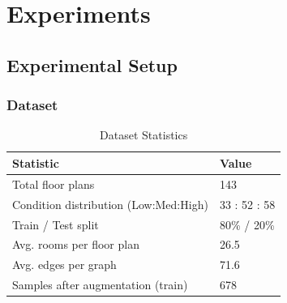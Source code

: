 \section{Experiments}
\label{sec:experiments}

\subsection{Experimental Setup}
\label{subsec:exp_setup}

\subsubsection{Dataset}
\label{subsubsec:dataset}


\begin{table}[t]
\centering
\caption{Dataset Statistics}
\label{tab:dataset_stats}
\begin{tabularx}{\columnwidth}{lX}
\toprule
Statistic & Value \\
\midrule
Total floor plans & 143 \\
Condition distribution (Low:Med:High) & 33 : 52 : 58 \\
Train / Test split & 80\% / 20\% \\
Avg. rooms per floor plan & 26.5 \\
Avg. edges per graph & 71.6 \\
Samples after augmentation (train) & 678 \\
\bottomrule
\end{tabularx}
\end{table}


